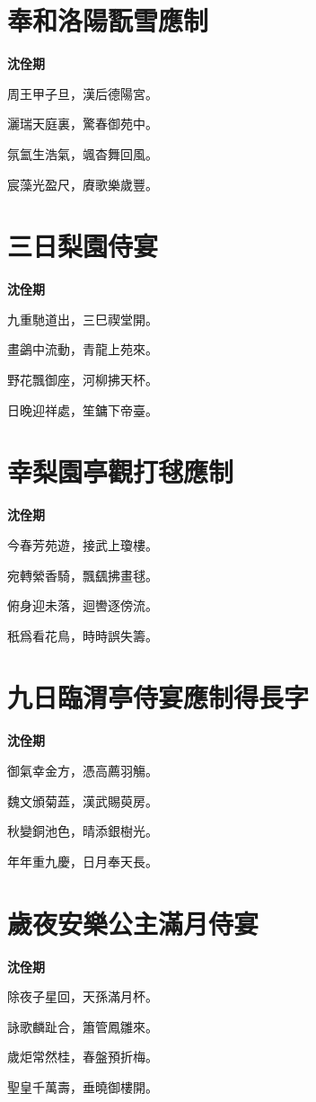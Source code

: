 \documentclass[12pt,a4paper]{ctexbook}
\begin{document}
\section{奉和洛陽翫雪應制}
\textbf{沈佺期}\par\vspace{0.5em}
周王甲子旦，漢后德陽宮。\par
灑瑞天庭裏，驚春御苑中。\par
氛氳生浩氣，颯杳舞回風。\par
宸藻光盈尺，賡歌樂歲豐。\par

\section{三日梨園侍宴}
\textbf{沈佺期}\par\vspace{0.5em}
九重馳道出，三巳禊堂開。\par
畫鷁中流動，青龍上苑來。\par
野花飄御座，河柳拂天杯。\par
日晚迎祥處，笙鏞下帝臺。\par

\section{幸梨園亭觀打毬應制}
\textbf{沈佺期}\par\vspace{0.5em}
今春芳苑遊，接武上瓊樓。\par
宛轉縈香騎，飄颻拂畫毬。\par
俯身迎未落，迴轡逐傍流。\par
秖爲看花鳥，時時誤失籌。\par

\section{九日臨渭亭侍宴應制得長字}
\textbf{沈佺期}\par\vspace{0.5em}
御氣幸金方，憑高薦羽觴。\par
魏文頒菊蕋，漢武賜萸房。\par
秋變銅池色，晴添銀樹光。\par
年年重九慶，日月奉天長。\par

\section{歲夜安樂公主滿月侍宴}
\textbf{沈佺期}\par\vspace{0.5em}
除夜子星回，天孫滿月杯。\par
詠歌麟趾合，簫管鳳雛來。\par
歲炬常然桂，春盤預折梅。\par
聖皇千萬壽，垂曉御樓開。\par
\end{document}
